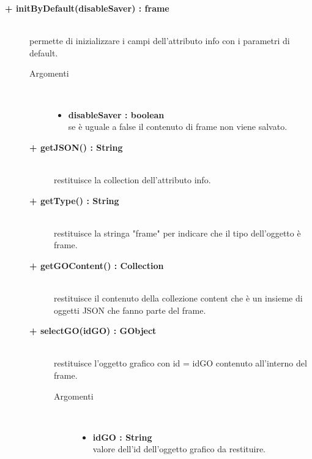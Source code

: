 \begin{description}
\begin{description}
		\item[\textbf{+ initByDefault(disableSaver) : frame			}] \hfill \\
			permette di inizializzare i campi dell'attributo info con i parametri di default. 

\begin{description}
			\item[Argomenti] \hfill \\
				\begin{itemize}
						\item \textbf{disableSaver : boolean			} \hfill \\
					se è uguale a false il contenuto di frame non viene salvato. %
				\end{itemize}

\end{description}

\begin{description}
		\item[\textbf{+ getJSON() : String			}] \hfill \\
			restituisce la collection dell'attributo info.

\end{description}

\begin{description}
		\item[\textbf{+ getType() : String			}] \hfill \\
			restituisce la stringa "frame" per indicare che il tipo dell'oggetto è frame.
\end{description}

\begin{description}
		\item[\textbf{+ getGOContent() : Collection			}] \hfill \\
			restituisce il contenuto della collezione content che è un insieme di oggetti JSON che fanno parte del frame.
\end{description}

\begin{description}
		\item[\textbf{+ selectGO(idGO) : GObject			}] \hfill \\
			restituisce l'oggetto grafico con id = idGO contenuto all'interno del frame. 

\begin{description}
			\item[Argomenti] \hfill \\
				\begin{itemize}
						\item \textbf{idGO : String			} \hfill \\
					valore dell'id dell'oggetto grafico da restituire.  				
				\end{itemize}


\end{description}
\end{description}
\end{description}
\end{description}
